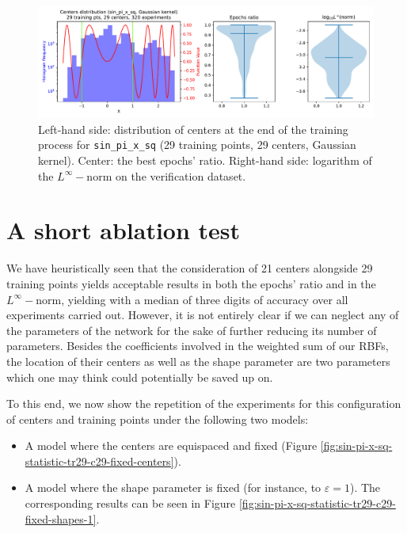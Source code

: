 \documentclass[12pt]{report} %
\begin{document}
\begin{figure}[ht]
  \centering
  \includegraphics[width=\textwidth]
  {imagenes/experiments/1d/sin_pi_x_sq_statistic_interpolation/tr29_c29_sin_pi_x_sq_gaussian_kernel.pdf}
  \caption{Left-hand side: distribution of centers at the end of the training process for
    \texttt{sin\_pi\_x\_sq} (29 training points, 29 centers, Gaussian kernel). Center: the best epochs' ratio.
    Right-hand side: logarithm of the $L^\infty-$norm on the verification dataset.}
  \label{fig:sin-pi-x-sq-statistic-tr29-c29}
\end{figure}

\section*{A short ablation test}

We have heuristically seen that the consideration of 21 centers alongside 29 training points
yields acceptable results in both the epochs' ratio and in the $L^\infty-$norm, yielding
with a median of three digits of accuracy over all experiments carried out. However,
it is not entirely clear if we can neglect any of the parameters of the network for the sake
of further reducing its number of parameters. Besides the coefficients involved in the
weighted sum of our RBFs, the location of their centers as well as the shape parameter
are two parameters which one may think could potentially be saved up on.

To this end, we now show the repetition of the
experiments for this configuration of centers and training points
under the following two models:
\begin{itemize}
  \item A model where the centers are equispaced and fixed (Figure
        \ref{fig:sin-pi-x-sq-statistic-tr29-c29-fixed-centers}).
  \item A model where the shape parameter is fixed (for instance, to $\varepsilon=1$).
        The corresponding results can be seen in Figure
        \ref{fig:sin-pi-x-sq-statistic-tr29-c29-fixed-shapes-1}.
\end{itemize}
\end{document}
